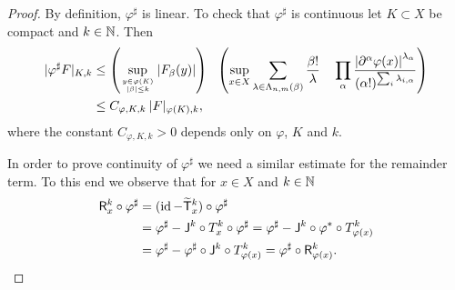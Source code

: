 \begin{proof}
  By definition, $\varphi^{\sharp}$ is linear. To check that  $\varphi^{\sharp}$ is continuous
  let $K \subset X$ be compact and $k\in \mathbb{N}$. Then 
  \begin{align}\label{SupnormEstimate}
 \nonumber  | \varphi^{\sharp}  F|_{K,k}  & \leq \left(\sup_{y\in \varphi (K) \atop |\beta| \leq k} | F_\beta (y) |\right) \!\! 
\quad \left(\sup_{x\in X}   \sum_{\lambda \in \Lambda_{n,m}(\beta)} {\beta !\over \lambda}\quad \prod_{\alpha}\frac{\left|\partial^\alpha \varphi(x)\right|^{\lambda_\alpha}}{(\alpha!)^{\sum_i \lambda_{i,\alpha}}}\right)\\
   & \leq C_{\varphi , K, k }  \: |F|_{\varphi (K) ,k} ,
  \end{align}
  where the constant $C_{\varphi , K, k }>0 $ depends only on $\varphi$, $K$ and 
  $k$. 
  
  
  In order to prove continuity of $\varphi^{\sharp}$ we need a similar estimate for the remainder term. To this end we observe that for $x\in X$ and $k\in\mathbb{N}$
  \begin{align*}
  \mathsf{R}_x^k\circ \varphi^{\sharp}&=(\operatorname{id}-\widetilde {\mathsf{T}}_x^k)\circ \varphi^{\sharp}\\
  &=\varphi^{\sharp}-\mathsf{J}^k\circ T^k_x \circ\varphi^{\sharp}=\varphi^{\sharp}-\mathsf{J}^k\circ \varphi^*\circ T^k_{\varphi(x)}\\
  &=\varphi^{\sharp}-\varphi^{\sharp}\circ\mathsf{J}^k\circ T^k_{\varphi(x)}=\varphi^{\sharp}\circ\mathsf{R}_{\varphi(x)}^k.
  \end{align*}
  

\end{proof}
